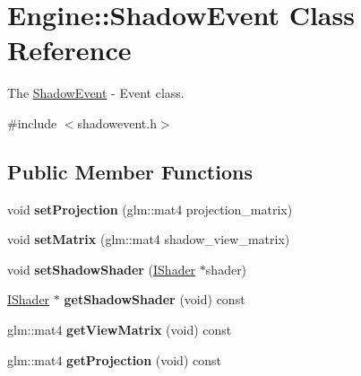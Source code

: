 \hypertarget{classEngine_1_1ShadowEvent}{}\section{Engine\+:\+:Shadow\+Event Class Reference}
\label{classEngine_1_1ShadowEvent}


The \hyperlink{classEngine_1_1ShadowEvent}{Shadow\+Event} -\/ Event class.  




{\ttfamily \#include $<$shadowevent.\+h$>$}

\subsection*{Public Member Functions}
\begin{DoxyCompactItemize}
\item 
\hypertarget{classEngine_1_1ShadowEvent_a795be7aa3f4d33f92ca53a58b5a3cf5b}{}void {\bfseries set\+Projection} (glm\+::mat4 projection\+\_\+matrix)\label{classEngine_1_1ShadowEvent_a795be7aa3f4d33f92ca53a58b5a3cf5b}

\item 
\hypertarget{classEngine_1_1ShadowEvent_ad4630998cafa554cd941824e745b03b6}{}void {\bfseries set\+Matrix} (glm\+::mat4 shadow\+\_\+view\+\_\+matrix)\label{classEngine_1_1ShadowEvent_ad4630998cafa554cd941824e745b03b6}

\item 
\hypertarget{classEngine_1_1ShadowEvent_ac2f0d9b1cb444a7c0dfea5b767c6776f}{}void {\bfseries set\+Shadow\+Shader} (\hyperlink{classEngine_1_1IShader}{I\+Shader} $\ast$shader)\label{classEngine_1_1ShadowEvent_ac2f0d9b1cb444a7c0dfea5b767c6776f}

\item 
\hypertarget{classEngine_1_1ShadowEvent_a9f2a5cc88e939acfada62435c3b63eb6}{}\hyperlink{classEngine_1_1IShader}{I\+Shader} $\ast$ {\bfseries get\+Shadow\+Shader} (void) const \label{classEngine_1_1ShadowEvent_a9f2a5cc88e939acfada62435c3b63eb6}

\item 
\hypertarget{classEngine_1_1ShadowEvent_a0b0838ac90dce47bbdedcb2334a44462}{}glm\+::mat4 {\bfseries get\+View\+Matrix} (void) const \label{classEngine_1_1ShadowEvent_a0b0838ac90dce47bbdedcb2334a44462}

\item 
\hypertarget{classEngine_1_1ShadowEvent_aceb75064aaab60a83af77155b18c2e89}{}glm\+::mat4 {\bfseries get\+Projection} (void) const \label{classEngine_1_1ShadowEvent_aceb75064aaab60a83af77155b18c2e89}

\end{DoxyCompactItemize}


